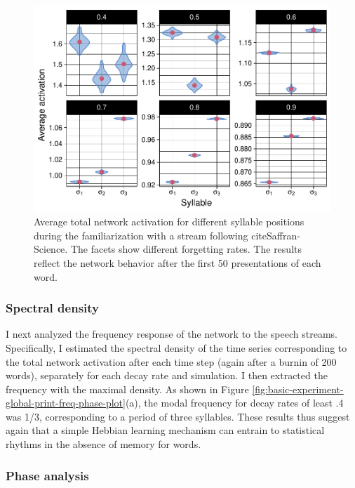 \documentclass[
]{article}
\begin{document}
\begin{figure}
\includegraphics[width=1\linewidth]{tp_model_entrainment_files/figure-latex/basic-experiment-global-print-act-in-words-plot-1} \caption{Average total network activation for different syllable positions during the familiarization with a stream following cite{Saffran-Science}. The facets show different forgetting rates. The results reflect the network behavior after the first 50 presentations of each word.}\label{fig:basic-experiment-global-print-act-in-words-plot}
\end{figure}

\hypertarget{spectral-density}{%
\subsubsection{Spectral density}\label{spectral-density}}

I next analyzed the frequency response of the network to the speech
streams. Specifically, I estimated the spectral density of the time
series corresponding to the total network activation after each time
step (again after a burnin of 200 words), separately for each decay rate
and simulation. I then extracted the frequency with the maximal density.
As shown in Figure
\ref{fig:basic-experiment-global-print-freq-phase-plot}(a), the modal
frequency for decay rates of least .4 was 1/3, corresponding to a period
of three syllables. These results thus suggest again that a simple
Hebbian learning mechanism can entrain to statistical rhythms in the
absence of memory for words.

\hypertarget{phase-analysis}{%
\subsubsection{Phase analysis}\label{phase-analysis}}
\end{document}
